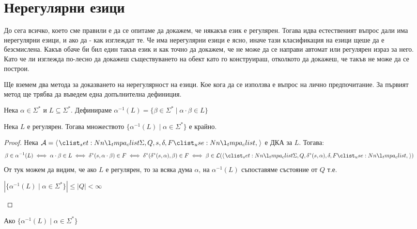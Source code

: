 \section{Нерегулярни езици}

До сега всичко, което сме правили е да се опитаме да докажем, че някакъв език е регулярен.
Тогава идва естественият въпрос дали има нерегулярни езици, и ако да - как изглеждат те.
Че има нерегулярни езици е ясно, иначе тази класификация на езици щеше да е безсмислена.
Какъв обаче би бил един такъв език и как точно да докажем, че не може да се направи автомат или регулярен израз за него.
Като че ли изглежда по-лесно да докажеш съществуването на обект като го конструираш, отколкото да докажеш, че такъв не може да се построи.

Ще вземем два метода за доказването на нерегулярност на езици.
Кое кога да се използва е въпрос на лично предпочитание.
За първият метод ще трябва да въведем една допълнителна дефиниция.

\begin{definition}
    Нека $\alpha \in \Sigma^*$ и $L \subseteq \Sigma^*$. Дефинираме $\alpha^{-1}(L) = \{ \beta \in \Sigma^* \mid \alpha \cdot \beta \in L \}$
\end{definition}

\begin{claim}
    Нека $L$ е регулярен.
    Тогава множеството $\{ \alpha^{-1}(L) \mid \alpha \in \Sigma^* \}$ е крайно.
\end{claim}

\begin{proof}
    Нека $\mathcal{A} = \opair{\Sigma, Q, s, \delta, F}$ е ДКА за $L$. Тогава:
    \begin{align*}
        \beta \in \alpha^{-1}(L) & \iff \alpha \cdot \beta \in L \iff \delta^*(s, \alpha \cdot \beta) \in F \iff \delta^*(\delta^*(s, \alpha), \beta) \in F \iff \beta \in \mathcal{L}(\opair{\Sigma, Q, \delta^*(s, \alpha), \delta, F})
    \end{align*}
    От тук можем да видим, че ако $L$ е регулярен, то за всяка дума $\alpha$,
    на $\alpha^{-1}(L)$ съпоставяме състояние от $Q$ т.е.
    \begin{center}
        $|\{ \alpha^{-1}(L) \mid \alpha \in \Sigma^* \}| \leq |Q| < \infty$
    \end{center}
\end{proof}

\begin{corollary}
    Ако $\{ \alpha^{-1}(L) \mid \alpha \in \Sigma^* \}$
\end{corollary}

